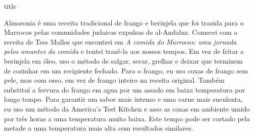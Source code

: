 \documentclass [11pt, papel de carta] {article}
\begin{document}
 {title}

Almoronia é uma receita tradicional de frango e berinjela que foi trazida para o Marrocos pelas comunidades judaicas expulsas de al-Andaluz. Comecei com a receita de Tess Mallos que encontrei em {\it A comida do Marrocos: uma jornada pelos amantes da comida} e tentei trazê-la aos nossos tempos. Em vez de fritar a berinjela em óleo, uso o método de salgar, secar, grelhar e deixar que terminem de cozinhar em um recipiente fechado. Para o frango, eu uso coxas de frango sem pele, mas com osso, em vez de frango inteiro na receita original. Também substituí a fervura do frango em agua por um assado em baixa temperatura por longo tempo. Para garantir um sabor mais intenso e uma carne mais suculenta, eu uso um método da America's Test Kitchen e asso as coxas em ambiente umido por três horas a uma temperatura muito baixa. Este tempo pode ser cortado pela metade a uma temperatura mais alta com resultados similares.
\end{document}

